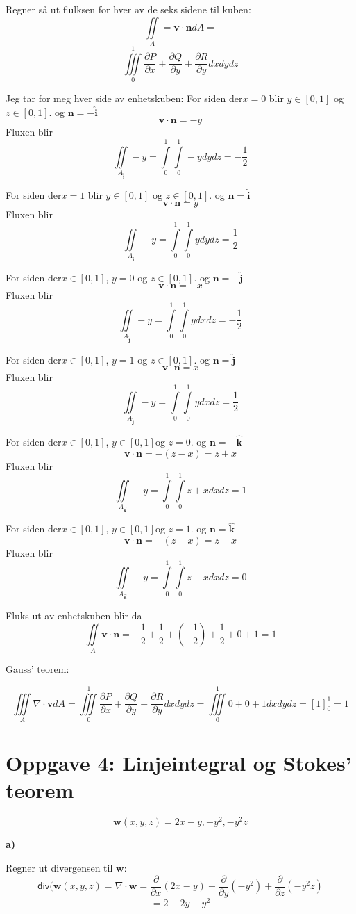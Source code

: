 \documentclass[11pt,a4paper, leqno]{report}
\newcommand{\ihat}{\boldsymbol{\hat{\textbf{i}}}}
\newcommand{\jhat}{\boldsymbol{\hat{\textbf{j}}}}
\newcommand{\khat}{\boldsymbol{\hat{\textbf{k}}}}
\newcommand{\partd}[1]{\frac {\partial} {\partial #1}}
\newcommand{\partdd}[2]{\frac {\partial #1} {\partial #2}}
\begin{document}
	Regner så ut flulksen for hver av de seks sidene til kuben:
	$$\iint\limits_A=\mathbf{v}\cdot\mathbf{n}dA=$$
	$$\iiint\limits_0^1\partdd P x +\partdd Q y +\partdd R y dxdydz$$

	Jeg tar for meg hver side av enhetskuben:
	For siden der$x=0$ blir $y \in [0,1]$ og $z\in [0,1]$. og  $\mathbf{n}=-\ihat$
	$$\mathbf{v} \cdot \mathbf{n}=-y$$
	Fluxen blir
	$$\iint\limits_{A_{\ihat}}-y=\int\limits_0^1\int\limits_0^1 -y dydz=-\frac{1}{2}$$
 
	For siden der$x=1$ blir $y \in [0,1]$ og $z\in [0,1]$. og  $\mathbf{n}=\ihat$
	$$\mathbf{v} \cdot \mathbf{n}=y$$
	Fluxen blir
	$$\iint\limits_{A_{\ihat}}-y=\int\limits_0^1\int\limits_0^1 y dydz=\frac{1}{2}$$

	For siden der$x \in [0,1]$,  $y=0$ og $z\in [0,1]$. og  $\mathbf{n}=-\jhat$	
	$$\mathbf{v} \cdot \mathbf{n}=-x$$
	Fluxen blir
	$$\iint\limits_{A_{\jhat}}-y=\int\limits_0^1\int\limits_0^1 y dxdz=-\frac{1}{2}$$

	For siden der$x \in [0,1]$,  $y=1$ og $z\in [0,1]$. og  $\mathbf{n}=\jhat$
	$$\mathbf{v} \cdot \mathbf{n}=x$$
	Fluxen blir
	$$\iint\limits_{A_{\jhat}}-y=\int\limits_0^1\int\limits_0^1 y dxdz=\frac{1}{2}$$

	For siden der$x \in [0,1]$,  $y \in [0,1]$og $z=0$. og  $\mathbf{n}=-\khat$	
	$$\mathbf{v} \cdot \mathbf{n}=-(z-x)=z+x$$
	Fluxen blir
	$$\iint\limits_{A_{\khat}}-y=\int\limits_0^1\int\limits_0^1 z+x dxdz=1$$

	For siden der$x \in [0,1]$,  $y \in [0,1]$og $z=1$. og  $\mathbf{n}=\khat$
	$$\mathbf{v} \cdot \mathbf{n}=-(z-x)=z-x$$
	Fluxen blir
	$$\iint\limits_{A_{\khat}}-y=\int\limits_0^1\int\limits_0^1 z-x dxdz=0$$

	Fluks ut av enhetskuben blir da
	$$\iint\limits_A \mathbf{v} \cdot \mathbf{n} =-\frac{1}{2}+\frac{1}{2}+\left(-\frac{1}{2}\right)+\frac{1}{2}+0+1=1$$
	
	Gauss' teorem:

	$$\iiint\limits_A \nabla \cdot \mathbf{v}dA=\iiint\limits_0^1\partdd P x +\partdd Q y +\partdd R y dxdydz=\iiint\limits_0^1 0 + 0 +1dxdydz=[1]_0^1=1$$
	\newpage
\section{Oppgave 4: Linjeintegral og Stokes' teorem}
	$$\mathbf{w}(x,y,z)=2x-y, -y^2, -y^2z$$
	
	\textbf{a)}

	Regner ut divergensen til $\mathbf{w}$:
	$$\mathsf{div}(\mathbf{w}(x,y,z)=\nabla\cdot\mathbf{w}=\partd x (2x-y) +\partd y (-y^2) + \partd z (-y^2z)$$
	$$=2 -2y-y^2$$
\end{document}
